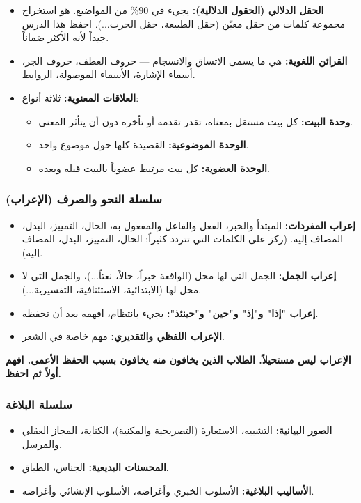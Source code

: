 \documentclass[12pt,a4paper]{book}
\newcommand{\importantAr}[1]{%
	\begin{important}
		\bfseries #1
	\end{important}
}
\begin{document}
	\begin{itemize}
		\item \textbf{الحقل الدلالي (الحقول الدلالية):} يجيء في 90\% من المواضيع. هو استخراج مجموعة كلمات من حقل معيّن (حقل الطبيعة، حقل الحرب...). احفظ هذا الدرس جيداً لأنه الأكثر ضماناً.
		\item \textbf{القرائن اللغوية:} هي ما يسمى الاتساق والانسجام — حروف العطف، حروف الجر، أسماء الإشارة، الأسماء الموصولة، الروابط.
		\item \textbf{العلاقات المعنوية:} ثلاثة أنواع:
		\begin{itemize}
			\item \textbf{وحدة البيت:} كل بيت مستقل بمعناه، تقدر تقدمه أو تأخره دون أن يتأثر المعنى.
			\item \textbf{الوحدة الموضوعية:} القصيدة كلها حول موضوع واحد.
			\item \textbf{الوحدة العضوية:} كل بيت مرتبط عضوياً بالبيت قبله وبعده.
		\end{itemize}
	\end{itemize}
	
	\subsubsection*{سلسلة النحو والصرف (الإعراب)}
		\label{sec:arabic-grammar-post}
	
	\begin{itemize}
		\item \textbf{إعراب المفردات:} المبتدأ والخبر، الفعل والفاعل والمفعول به، الحال، التمييز، البدل، المضاف إليه. (ركز على الكلمات التي تتردد كثيراً: الحال، التمييز، البدل، المضاف إليه).
		\item \textbf{إعراب الجمل:} الجمل التي لها محل (الواقعة خبراً، حالاً، نعتاً...)، والجمل التي لا محل لها (الابتدائية، الاستئنافية، التفسيرية...).
		\item \textbf{إعراب "إذا" و"إذ" و"حين" و"حينئذ":} يجيء بانتظام، افهمه بعد أن تحفظه.
		\item \textbf{الإعراب اللفظي والتقديري:} مهم خاصة في الشعر.
	\end{itemize}
	
	\importantAr{الإعراب ليس مستحيلاً. الطلاب الذين يخافون منه يخافون بسبب الحفظ الأعمى. افهم أولاً ثم احفظ.}
	
	\subsubsection*{سلسلة البلاغة}
	
	\begin{itemize}
		\item \textbf{الصور البيانية:} التشبيه، الاستعارة (التصريحية والمكنية)، الكناية، المجاز العقلي والمرسل.
		\item \textbf{المحسنات البديعية:} الجناس، الطباق.
		\item \textbf{الأساليب البلاغية:} الأسلوب الخبري وأغراضه، الأسلوب الإنشائي وأغراضه.
	\end{itemize}
	
\end{document}
